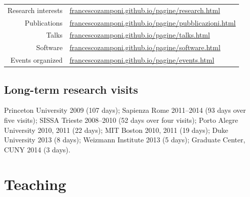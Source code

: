 \documentclass[a4paper,10pt]{article}
\begin{document}
\begin{tabularx}{\textwidth}{@{}D L@{}}
Research interests & \href{https://francescozamponi.github.io/pagine/research.html}{francescozamponi.github.io/pagine/research.html} \\
Publications & \href{https://francescozamponi.github.io/pagine/pubblicazioni.html}{francescozamponi.github.io/pagine/pubblicazioni.html} \\
Talks & \href{https://francescozamponi.github.io/pagine/talks.html}{francescozamponi.github.io/pagine/talks.html} \\
Software & \href{https://francescozamponi.github.io/pagine/software.html}{francescozamponi.github.io/pagine/software.html} \\
Events organized & \href{https://francescozamponi.github.io/pagine/events.html}{francescozamponi.github.io/pagine/events.html} \\
\end{tabularx}

\subsection{Long-term research visits}
\vspace{2pt}
{\small Princeton University 2009 (107 days); Sapienza Rome 2011--2014 (93 days over five visits);
SISSA Trieste 2008--2010 (52 days over four visits); Porto Alegre University 2010, 2011 (22 days);
MIT Boston 2010, 2011 (19 days); Duke University 2013 (8 days); Weizmann Institute 2013 (5 days);
Graduate Center, CUNY 2014 (3 days).}

\section{Teaching}
\end{document}
